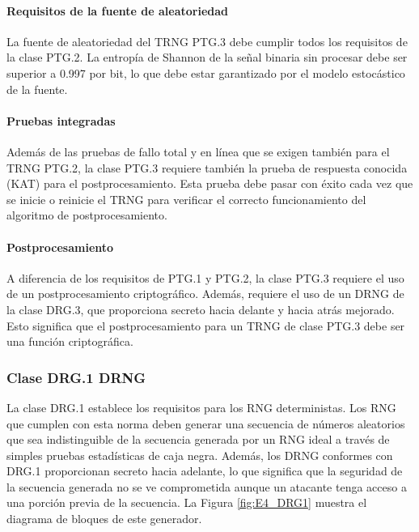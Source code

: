                 \paragraph{Requisitos de la fuente de aleatoriedad\\}
            
                La fuente de aleatoriedad del TRNG PTG.3 debe cumplir todos los requisitos de la clase PTG.2. La entropía de Shannon de la señal binaria sin procesar debe ser superior a 0.997 por bit, lo que debe estar garantizado por el modelo estocástico de la fuente.

                \paragraph{Pruebas integradas\\}
            
                Además de las pruebas de fallo total y en línea que se exigen también para el TRNG PTG.2, la clase PTG.3 requiere también la prueba de respuesta conocida (KAT) para el postprocesamiento. Esta prueba debe pasar con éxito cada vez que se inicie o reinicie el TRNG para verificar el correcto funcionamiento del algoritmo de postprocesamiento.
                
                \paragraph{Postprocesamiento\\}
            
                A diferencia de los requisitos de PTG.1 y PTG.2, la clase PTG.3 requiere el uso de un postprocesamiento criptográfico. Además, requiere el uso de un DRNG de la clase DRG.3, que proporciona secreto hacia delante y hacia atrás mejorado. Esto significa que el postprocesamiento para un TRNG de clase PTG.3 debe ser una función criptográfica.

            \subsubsection{Clase DRG.1 DRNG}

                La clase DRG.1 establece los requisitos para los RNG deterministas. Los RNG que cumplen con esta norma deben generar una secuencia de números aleatorios que sea indistinguible de la secuencia generada por un RNG ideal a través de simples pruebas estadísticas de caja negra. Además, los DRNG conformes con DRG.1 proporcionan secreto hacia adelante, lo que significa que la seguridad de la secuencia generada no se ve comprometida aunque un atacante tenga acceso a una porción previa de la secuencia. La Figura \ref{fig:E4_DRG1} muestra el diagrama de bloques de este generador.

